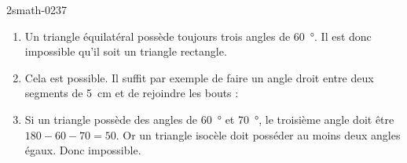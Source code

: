 
\begin{corrige}{2smath-0237}

    \begin{enumerate}
        \item
            Un triangle équilatéral possède toujours trois angles de \SI{60}{\degree}. Il est donc impossible qu'il soit un triangle rectangle.
        \item
            Cela est possible. Il suffit par exemple de faire un angle droit entre deux segments de \SI{5}{\centi\meter} et de rejoindre les bouts :

\begin{center}
   
\end{center}

\item
     
    Si un triangle possède des angles de \SI{60}{\degree} et \SI{70}{\degree}, le troisième angle doit être \( 180-60-70=50\). Or un triangle isocèle doit posséder au moins deux angles égaux. Donc impossible.

    \end{enumerate}

\end{corrige}
